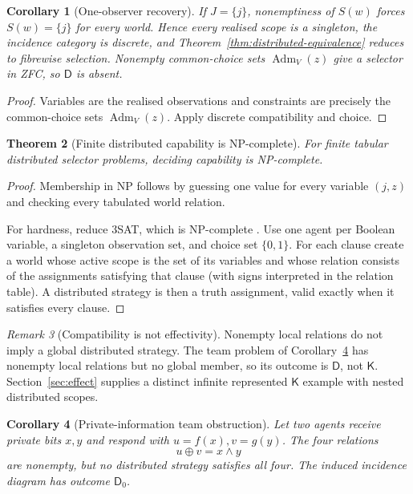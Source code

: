 \documentclass[11pt]{article}
\theoremstyle{plain}
\newtheorem{theorem}{Theorem}[section]
\newtheorem{corollary}[theorem]{Corollary}
\theoremstyle{definition}
\theoremstyle{remark}
\newtheorem{remark}[theorem]{Remark}
\newcommand{\Adm}{\operatorname{Adm}}
\begin{document}
\begin{corollary}[One-observer recovery]\label{cor:distributed-one}
If $J=\{j\}$, nonemptiness of $S(w)$ forces $S(w)=\{j\}$ for every world.
Hence every realised scope is a singleton, the incidence category is discrete,
and Theorem~\ref{thm:distributed-equivalence} reduces to fibrewise selection. Nonempty common-choice sets $\Adm_V(z)$ give a selector in ZFC, so $\mathsf D$ is absent.
\end{corollary}

\begin{proof}
Variables are the realised observations and constraints are precisely the
common-choice sets $\Adm_V(z)$. Apply discrete compatibility and choice.
\end{proof}

\begin{theorem}[Finite distributed capability is NP-complete]
\label{thm:distributed-NP}
For finite tabular distributed selector problems, deciding capability is
NP-complete.
\end{theorem}

\begin{proof}
Membership in NP follows by guessing one value for every variable $(j,z)$ and
checking every tabulated world relation.

For hardness, reduce 3SAT, which is NP-complete \cite{karp}. Use one agent
per Boolean variable, a singleton
observation set, and choice set $\{0,1\}$. For each clause create a world whose
active scope is the set of its variables and whose relation consists of the
assignments satisfying that clause (with signs interpreted in the
relation table). A distributed strategy is then a truth assignment, valid
exactly when it satisfies every clause.
\end{proof}

\begin{remark}[Compatibility is not effectivity]
Nonempty local relations do not imply a global distributed strategy. The team
problem of Corollary~\ref{cor:team-decision} has nonempty local relations but no
global member, so its outcome is $\mathsf D$, not $\mathsf K$.
Section~\ref{sec:effect} supplies a distinct infinite represented
$\mathsf K$ example with nested distributed scopes.
\end{remark}



\begin{corollary}[Private-information team obstruction]
\label{cor:team-decision}
Let two agents receive private bits $x,y$ and respond with
$u=f(x),v=g(y)$. The four relations
\[
u\oplus v=x\wedge y
\]
are nonempty, but no distributed strategy satisfies all four. The induced
incidence diagram has outcome $\mathsf D_0$.
\end{corollary}
\end{document}
